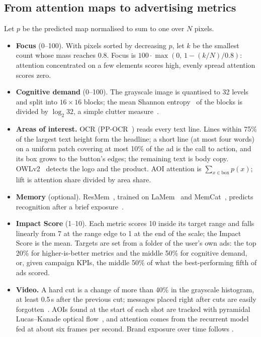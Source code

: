 \documentclass[11pt]{article}
\begin{document}
\subsection{From attention maps to advertising metrics}
Let $p$ be the predicted map normalised to sum to one over $N$ pixels.
\begin{itemize}
\item \textbf{Focus} (0--100). With pixels sorted by decreasing $p$, let $k$ be the smallest count whose mass reaches
0.8. Focus is $100\cdot\max(0,\, 1 - (k/N)/0.8)$: attention concentrated on a few elements scores high, evenly spread
attention scores zero.
\item \textbf{Cognitive demand} (0--100). The grayscale image is quantised to 32 levels and split into $16\times16$
blocks; the mean Shannon entropy~\cite{shannon1948} of the blocks is divided by $\log_2 32$, a simple clutter
measure~\cite{rosenholtz2007clutter}.
\item \textbf{Areas of interest.} OCR (PP-OCR~\cite{du2020ppocr}) reads every text line. Lines within 75\% of the
largest text height form the headline; a short line (at most four words) on a uniform patch covering at most 10\% of
the ad is the call to action, and its box grows to the button's edges; the remaining text is body copy.
OWLv2~\cite{minderer2023owlv2} detects the logo and the product. AOI attention is $\sum_{x\in\text{box}} p(x)$; lift is
attention share divided by area share.
\item \textbf{Memory} (optional). ResMem~\cite{needell2022resmem}, trained on LaMem~\cite{khosla2015lamem} and
MemCat~\cite{goetschalckx2019memcat}, predicts recognition after a brief exposure~\cite{isola2011memorable}.
\item \textbf{Impact Score} (1--10). Each metric scores 10 inside its target range and falls linearly from 7 at the
range edge to 1 at the end of the scale; the Impact Score is the mean. Targets are set from a folder of the user's own
ads: the top 20\% for higher-is-better metrics and the middle 50\% for cognitive demand, or, given campaign KPIs, the
middle 50\% of what the best-performing fifth of ads scored.
\item \textbf{Video.} A hard cut is a change of more than 40\% in the grayscale histogram, at least 0.5\,s after the
previous cut; messages placed right after cuts are easily forgotten~\cite{radvansky2011doorways}. AOIs found at the
start of each shot are tracked with pyramidal Lucas--Kanade optical flow~\cite{lucas1981iterative,shi1994good}, and
attention comes from the recurrent model fed at about six frames per second. Brand exposure over time follows
\cite{teixeira2010branding}.
\end{itemize}
\end{document}
